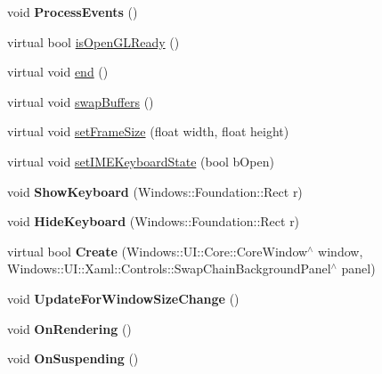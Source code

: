 \begin{DoxyCompactItemize}
\mbox{\label{classGLViewImpl_a88b7bca1cd5408b7d8badbaaf7dea338}} 
void {\bfseries Process\+Events} ()
\item 
virtual bool \hyperlink{classGLViewImpl_a4fdf5280c768291ab6a46731639f8829}{is\+Open\+G\+L\+Ready} ()
\item 
virtual void \hyperlink{classGLViewImpl_a045b39ae9907d0c2d25d49a70e5ce9e4}{end} ()
\item 
virtual void \hyperlink{classGLViewImpl_afe7883d151fd7d92d19d3359dc33e8b9}{swap\+Buffers} ()
\item 
virtual void \hyperlink{classGLViewImpl_ab7eed967b49c7807cbaeb186e3df8f1c}{set\+Frame\+Size} (float width, float height)
\item 
virtual void \hyperlink{classGLViewImpl_a97c906321e44204249b112de5706a617}{set\+I\+M\+E\+Keyboard\+State} (bool b\+Open)
\item 
\mbox{\label{classGLViewImpl_a6f9596c1b330ce9d9d5e701786075e06}} 
void {\bfseries Show\+Keyboard} (Windows\+::\+Foundation\+::\+Rect r)
\item 
\mbox{\label{classGLViewImpl_a1b93efc6064aef2ed7e20659fb67618f}} 
void {\bfseries Hide\+Keyboard} (Windows\+::\+Foundation\+::\+Rect r)
\item 
\mbox{\label{classGLViewImpl_aae3bf3ac1ee0dfadb7fb1d72835d090d}} 
virtual bool {\bfseries Create} (Windows\+::\+U\+I\+::\+Core\+::\+Core\+Window$^\wedge$ window, Windows\+::\+U\+I\+::\+Xaml\+::\+Controls\+::\+Swap\+Chain\+Background\+Panel$^\wedge$ panel)
\item 
\mbox{\label{classGLViewImpl_ae1c0d93f67722d5775cfc529949bf9f0}} 
void {\bfseries Update\+For\+Window\+Size\+Change} ()
\item 
\mbox{\label{classGLViewImpl_a7ea4872f94bd3858ddda8ab1565ff041}} 
void {\bfseries On\+Rendering} ()
\item 
\mbox{\label{classGLViewImpl_a5da714df808fcb79d643fb59fd8f4d7c}} 
void {\bfseries On\+Suspending} ()
\item 
\mbox{\label{classGLViewImpl_ae40958ea2c778cbcdb8a9ca7f5f5be04}} 

\end{DoxyCompactItemize}

